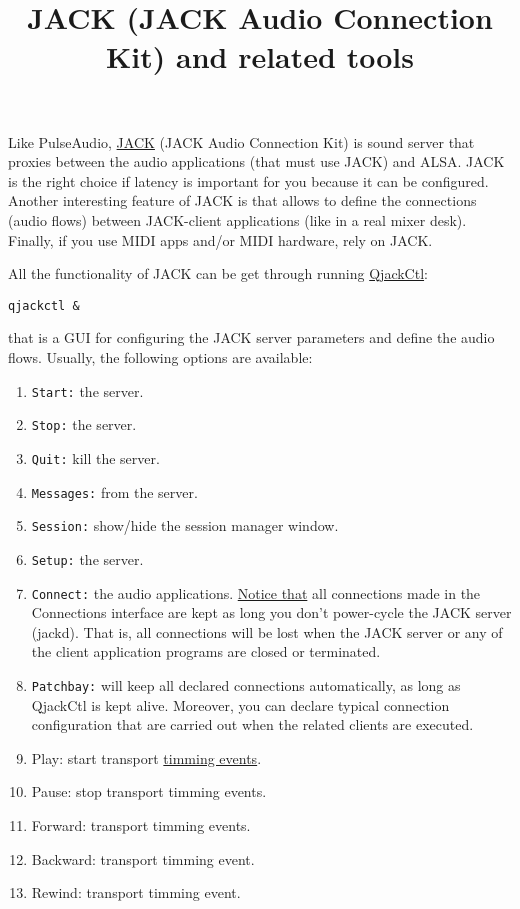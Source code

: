 \title{JACK (JACK Audio Connection Kit) and related tools}

\maketitle

Like PulseAudio, \href{http://jackaudio.org/}{JACK} (JACK Audio
Connection Kit) \cite{letz2005jack} is sound server that proxies
between the audio applications (that must use JACK) and ALSA. JACK is
the right choice if latency is important for you because it can be
configured. Another interesting feature of JACK is that allows to
define the connections (audio flows) between JACK-client applications
(like in a real mixer desk). Finally, if you use MIDI apps and/or MIDI
hardware, rely on JACK.

All the functionality of JACK can be get through running
\href{https://qjackctl.sourceforge.io/}{QjackCtl}:
\begin{verbatim}
qjackctl &
\end{verbatim}
that is a GUI for configuring the JACK server parameters and define the audio flows. Usually, the following options are available:
\begin{enumerate}
\item \texttt{Start:} the server.
\item \texttt{Stop:} the server.
\item \texttt{Quit:} kill the server.
\item \texttt{Messages:} from the server.
\item \texttt{Session:} show/hide the session manager window.
\item \texttt{Setup:} the server. 
\item \texttt{Connect:} the audio
  applications. \href{http://www.rncbc.org/drupal/node/76}{Notice
    that} all connections made in the Connections interface are kept
  as long you don't power-cycle the JACK server (jackd). That is, all
  connections will be lost when the JACK server or any of the client
  application programs are closed or terminated.
\item \texttt{Patchbay:} will keep all declared connections
  automatically, as long as QjackCtl is kept alive. Moreover, you can
  declare typical connection configuration that are carried out when
  the related clients are executed.
\item Play: start transport
  \href{https://jackaudio.org/api/group__MIDIAPI.html}{timming
    events}.
\item Pause: stop transport timming events.
\item Forward: transport timming events.
\item Backward: transport timming event.
\item Rewind: transport timming event.
\end{enumerate}

